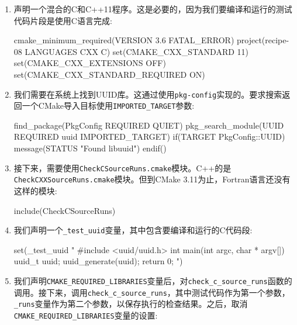 \begin{enumerate}
\item 声明一个混合的C和C++11程序。这是必要的，因为我们要编译和运行的测试代码片段是使用C语言完成:

\begin{codebox}[cmake]
cmake_minimum_required(VERSION 3.6 FATAL_ERROR)
project(recipe-08 LANGUAGES CXX C)
set(CMAKE_CXX_STANDARD 11)
set(CMAKE_CXX_EXTENSIONS OFF)
set(CMAKE_CXX_STANDARD_REQUIRED ON)
\end{codebox}

\item 我们需要在系统上找到UUID库。这通过使用\texttt{pkg-config}实现的。要求搜索返回一个CMake导入目标使用\texttt{IMPORTED\_TARGET}参数:

\begin{codebox}[cmake]
find_package(PkgConfig REQUIRED QUIET)
pkg_search_module(UUID REQUIRED uuid IMPORTED_TARGET)
if(TARGET PkgConfig::UUID)
    message(STATUS "Found libuuid")
endif()
\end{codebox}

\item 接下来，需要使用\texttt{CheckCSourceRuns.cmake}模块。C++的是\texttt{CheckCXXSourceRuns.cmake}模块。但到CMake 3.11为止，Fortran语言还没有这样的模块:

\begin{codebox}[cmake]
include(CheckCSourceRuns)
\end{codebox}

\item 我们声明一个\texttt{\_test\_uuid}变量，其中包含要编译和运行的C代码段:

\begin{codebox}[cmake]
set(_test_uuid
"
#include <uuid/uuid.h>
int main(int argc, char * argv[]) {
  uuid_t uuid;
  uuid_generate(uuid);
  return 0;
}
")
\end{codebox}

\item 我们声明\texttt{CMAKE\_REQUIRED\_LIBRARIES}变量后，对\texttt{check\_c\_source\_runs}函数的调用。接下来，调用\texttt{check\_c\_source\_runs}，其中测试代码作为第一个参数，\texttt{\_runs}变量作为第二个参数，以保存执行的检查结果。之后，取消\texttt{CMAKE\_REQUIRED\_LIBRARIES}变量的设置:



\end{enumerate}
